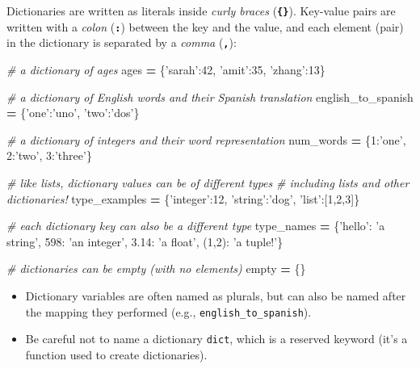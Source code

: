 \documentclass[]{book}
\newenvironment{Shaded}{\begin{snugshade}}{\end{snugshade}}
\newcommand{\DecValTok}[1]{\textcolor[rgb]{0.00,0.00,0.81}{#1}}
\newcommand{\FloatTok}[1]{\textcolor[rgb]{0.00,0.00,0.81}{#1}}
\newcommand{\StringTok}[1]{\textcolor[rgb]{0.31,0.60,0.02}{#1}}
\newcommand{\CommentTok}[1]{\textcolor[rgb]{0.56,0.35,0.01}{\textit{#1}}}
\newcommand{\OperatorTok}[1]{\textcolor[rgb]{0.81,0.36,0.00}{\textbf{#1}}}
\newcommand{\NormalTok}[1]{#1}
\providecommand{\tightlist}{%
  \setlength{\itemsep}{0pt}\setlength{\parskip}{0pt}}
\begin{document}
Dictionaries are written as literals inside \emph{curly braces}
(\textbf{\texttt{\{\}}}). Key-value pairs are written with a
\emph{colon} (\textbf{\texttt{:}}) between the key and the value, and
each element (pair) in the dictionary is separated by a \emph{comma}
(\textbf{\texttt{,}}):

\begin{Shaded}
\begin{Highlighting}[]
\CommentTok{# a dictionary of ages}
\NormalTok{ages }\OperatorTok{=}\NormalTok{ \{}\StringTok{'sarah'}\NormalTok{:}\DecValTok{42}\NormalTok{, }\StringTok{'amit'}\NormalTok{:}\DecValTok{35}\NormalTok{, }\StringTok{'zhang'}\NormalTok{:}\DecValTok{13}\NormalTok{\}}

\CommentTok{# a dictionary of English words and their Spanish translation}
\NormalTok{english_to_spanish }\OperatorTok{=}\NormalTok{ \{}\StringTok{'one'}\NormalTok{:}\StringTok{'uno'}\NormalTok{, }\StringTok{'two'}\NormalTok{:}\StringTok{'dos'}\NormalTok{\}}

\CommentTok{# a dictionary of integers and their word representation}
\NormalTok{num_words }\OperatorTok{=}\NormalTok{ \{}\DecValTok{1}\NormalTok{:}\StringTok{'one'}\NormalTok{, }\DecValTok{2}\NormalTok{:}\StringTok{'two'}\NormalTok{, }\DecValTok{3}\NormalTok{:}\StringTok{'three'}\NormalTok{\}}

\CommentTok{# like lists, dictionary values can be of different types}
\CommentTok{# including lists and other dictionaries!}
\NormalTok{type_examples }\OperatorTok{=}\NormalTok{ \{}\StringTok{'integer'}\NormalTok{:}\DecValTok{12}\NormalTok{, }\StringTok{'string'}\NormalTok{:}\StringTok{'dog'}\NormalTok{, }\StringTok{'list'}\NormalTok{:[}\DecValTok{1}\NormalTok{,}\DecValTok{2}\NormalTok{,}\DecValTok{3}\NormalTok{]\}}

\CommentTok{# each dictionary key can also be a different type}
\NormalTok{type_names }\OperatorTok{=}\NormalTok{ \{}\StringTok{'hello'}\NormalTok{: }\StringTok{'a string'}\NormalTok{, }\DecValTok{598}\NormalTok{: }\StringTok{'an integer'}\NormalTok{, }\FloatTok{3.14}\NormalTok{: }\StringTok{'a float'}\NormalTok{, (}\DecValTok{1}\NormalTok{,}\DecValTok{2}\NormalTok{): }\StringTok{'a tuple!'}\NormalTok{\}}

\CommentTok{# dictionaries can be empty (with no elements)}
\NormalTok{empty }\OperatorTok{=}\NormalTok{ \{\}}
\end{Highlighting}
\end{Shaded}

\begin{itemize}
\tightlist
\item
  Dictionary variables are often named as plurals, but can also be named
  after the mapping they performed (e.g.,
  \texttt{english\_to\_spanish}).
\item
  Be careful not to name a dictionary \texttt{dict}, which is a reserved
  keyword (it's a function used to create dictionaries).
\end{itemize}
\end{document}
